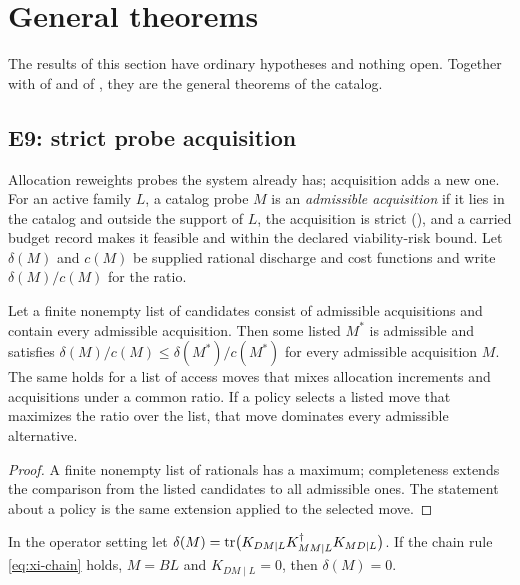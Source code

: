 \section{General theorems}\label{sec:theorems}

The results of this section have ordinary hypotheses and nothing open. Together with
 of  and  of ,
they are the general theorems of the catalog.

\subsection{E9: strict probe acquisition}\label{sec:E9}

Allocation reweights probes the system already has; acquisition adds a new one. For an active family
$L$, a catalog probe $M$ is an \emph{admissible acquisition} if it lies in the catalog and outside the
support of $L$, the acquisition is strict (), and a carried budget record makes it
feasible and within the declared viability-risk bound. Let $\delta(M)$ and $c(M)$ be supplied
rational discharge and cost functions and write $\delta(M)/c(M)$ for the ratio.

\begin{theorem}\label{thm:e9}
Let a finite nonempty list of candidates consist of admissible acquisitions and contain every
admissible acquisition. Then some listed $M^*$ is admissible and satisfies
$\delta(M)/c(M) \le \delta(M^*)/c(M^*)$ for every admissible acquisition $M$. The same holds for a
list of access moves that mixes allocation increments and acquisitions under a common ratio.
If a policy selects a listed move that maximizes the ratio over the list, that move dominates every
admissible alternative.
\end{theorem}

\begin{proof}
A finite nonempty list of rationals has a maximum; completeness extends the comparison from the
listed candidates to all admissible ones. The statement about a policy is the same extension applied
to the selected move.
\end{proof}

\begin{proposition}\label{prop:e9-saturation}
In the operator setting let $\delta(M) = \operatorname{tr}\bigl(K_{DM\mid L}K_{MM\mid L}^{\dagger}K_{MD\mid L}\bigr)$.
If the chain rule \eqref{eq:xi-chain} holds, $M = BL$ and $K_{DM\mid L} = 0$, then $\delta(M) = 0$.
\end{proposition}

